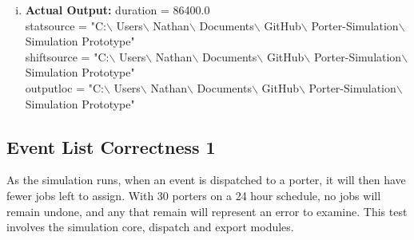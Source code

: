 \documentclass[paper=letter, fontsize=10pt]{scrartcl}
\numberwithin{equation}{section}		%
\numberwithin{figure}{section}			%
\numberwithin{table}{section}				%
\begin{document}
\begin{enumerate}[(i)]
	\item \textbf{Actual Output:} duration = 86400.0 \\
	 statsource = "C:$\backslash$ Users$\backslash$ Nathan$\backslash$ Documents$\backslash$ GitHub$\backslash$ Porter-Simulation$\backslash$ Simulation Prototype" \\
	 shiftsource = "C:$\backslash$ Users$\backslash$ Nathan$\backslash$ Documents$\backslash$ GitHub$\backslash$ Porter-Simulation$\backslash$ Simulation Prototype" \\
	 outputloc = "C:$\backslash$ Users$\backslash$ Nathan$\backslash$ Documents$\backslash$ GitHub$\backslash$ Porter-Simulation$\backslash$ Simulation Prototype" \\
\end{enumerate}

\subsection{Event List Correctness 1}
As the simulation runs, when an event is dispatched to a porter, it will then have fewer jobs left to assign. With 30 porters on a 24 hour schedule, no jobs will remain undone, and any that remain will represent an error to examine. This test involves the simulation core, dispatch and export modules.
\end{document}
